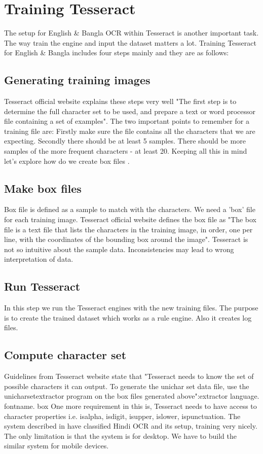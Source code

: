 \section{Training Tesseract}
The setup for English \& Bangla OCR within Tesseract is another important task. The way train the engine and input the dataset matters a lot\cite{TesseractTrain}.
Training Tesseract for English \& Bangla includes four steps mainly and they are as follows:
\subsection{Generating training images}
Tesseract official website explains these steps very well "The first step is to determine the full
character set to be used, and prepare a text or word processor file containing a set of examples". The two important points to remember for a training file are: Firstly make sure the file
contains all the characters that we are expecting. Secondly there should be at least 5 samples.
There should be more samples of the more frequent characters - at least 20. Keeping all this
in mind let's explore how do we create box files \cite{TesseractTrain}.
\subsection{Make box files}
Box file is defined as a sample to match with the characters. We need a 'box' file for each
training image. Tesseract official website defines the box file as "The box file is a text file that
lists the characters in the training image, in order, one per line, with the coordinates of the
bounding box around the image". Tesseract is not so intuitive about the sample data.
Inconsistencies may lead to wrong interpretation of data\cite{TesseractTrain}.
\subsection{Run Tesseract}
In this step we run the Tesseract engines with the new training files. The purpose is to create the
trained dataset which works as a rule engine. Also it creates log files\cite{TesseractTrain}.
\subsection{Compute character set} 
Guidelines from Tesseract website state that "Tesseract needs to know the set of possible characters it can output. To generate the unichar set data file, use the unicharset\textunderscore extractor program on the box files generated above":extractor language. fontname. box 
One more requirement in this is, Tesseract needs to have access to character properties i.e.
isalpha, isdigit, isupper, islower, ispunctuation.
The system described in have classified Hindi OCR and its setup, training very nicely.
The only limitation is that the system is for desktop. We have to build the similar system for
mobile devices.\cite{TesseractTrain}
